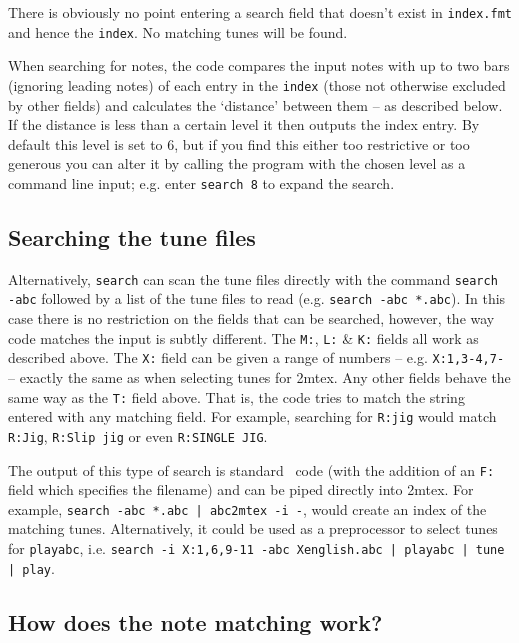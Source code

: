 There is obviously no point entering a search field that doesn't exist in
{\tt index.fmt} and hence the {\tt index}. No matching tunes will be found.

When searching for notes, the code compares the input notes with
up to two bars (ignoring leading notes) of each entry in the {\tt index} (those
not otherwise excluded by other fields) and calculates the `distance'
between them -- as described below. If the distance is less than
a certain level it then outputs the index entry. By default this level
is set to 6, but if you find this either too restrictive
or too generous you can alter it by calling the program with the chosen
level as a command line input; e.g. enter {\tt search 8} to expand the
search.

\subsection{Searching the tune files}

Alternatively, {\tt search} can scan the tune files directly with the command
{\tt search -abc} followed by a list of the tune files to read
(e.g. {\tt search -abc *.abc}). In this case there is no restriction
on the fields that can be searched, however, the way code
matches the input is subtly different. The {\tt M:}, {\tt L:} \&
{\tt K:} fields all work as described above. The {\tt X:} field
can be given a range of numbers -- e.g. {\tt X:1,3-4,7-} -- exactly
the same as when selecting tunes for \abc2mtex. Any other fields
behave the same way as the {\tt T:} field above. That is, the code
tries to match the string entered with any matching field. For
example, searching for {\tt R:jig} would match {\tt R:Jig}, {\tt R:Slip jig}
or even {\tt R:SINGLE JIG}.

The output of this type of search is standard \abc\ code (with the addition of
an {\tt F:} field which specifies the filename) and can be piped directly into
\abc2mtex. For example, {\tt search -abc *.abc | abc2mtex -i -}, would create an
index of the matching tunes. Alternatively, it could be used as a
preprocessor to select tunes for {\tt playabc}, i.e.
{\tt search -i X:1,6,9-11 -abc Xenglish.abc | playabc | tune | play}.

\subsection{How does the note matching work?}

